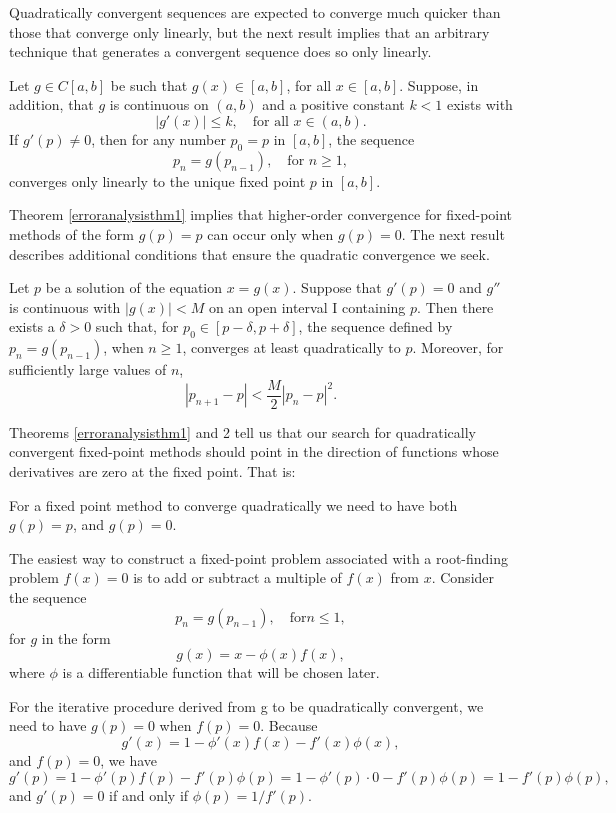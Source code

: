 Quadratically convergent sequences are expected to converge much quicker than those that converge only linearly, but the next result implies that an arbitrary technique that  generates a convergent sequence does so only linearly.

\begin{theorem}\label{erroranalysisthm1}
Let $g\in C[a,b]$ be such that $g(x)\in[a,b]$, for all $x\in[a,b]$. Suppose, in addition, that $g$ is  continuous on $(a,b)$ and a positive constant $k<1$ exists with
\[|g'(x)|\leq k,\quad\mbox{for all } x\in(a,b).\]
If $g'(p)\neq0$, then for any number $p_0=p$ in $[a,b]$, the sequence
\[p_n=g(p_{n-1}),\quad\mbox{for } n\geq1,\]
converges only linearly to the unique fixed point $p$ in $[a,b]$.
\end{theorem}

Theorem \ref{erroranalysisthm1} implies that higher-order convergence for fixed-point methods of the form $ g(p) = p$ can occur only when $g(p) = 0$. The next result describes additional conditions that ensure the quadratic convergence we seek.

\begin{theorem}\label{erroranalysisthem2}
Let $p$ be a solution of the equation $x = g(x)$. Suppose that $g'(p) = 0$ and $g''$ is continuous with $|g(x)|<M$ on an open interval I containing $p$. Then there exists a $\delta>0$ such that, for $p_0\in[p-\delta, p+\delta]$, the sequence defined by $p_n = g(p_{n-1})$, when $n\geq1$, converges at least quadratically to $p$.  Moreover, for sufficiently large values of $n$,
\[|p_{n+1}-p|<\frac{M}{2}|p_n-p|^2.\]
\end{theorem}
Theorems \ref{erroranalysisthm1} and 2 tell us that our search for quadratically convergent fixed-point methods should point in the direction of functions whose derivatives are zero at the fixed
 point. That is:
\begin{boxB} 
For a fixed point method to converge quadratically we need to have both $g(p) = p$, and $g(p) = 0$.
\end{boxB}

The easiest way to construct a fixed-point problem associated with a root-finding problem $f(x) = 0$ is to add or subtract a multiple of $f(x)$ from $x$. Consider the sequence
\[p_n=g(p_{n-1}),\quad \mbox{for} n\leq1,\]
for $g$ in the form
\[g(x)=x-\phi(x)f(x),\]
 where $\phi$ is a differentiable function that will be chosen later.

For the iterative procedure derived from g to be quadratically convergent, we need to have $g(p) = 0$ when $f(p) = 0$. Because
\[g'(x)=1-\phi'(x)f(x)-f'(x)\phi(x),\]
and $f(p)=0$, we have
\[g'(p)=1-\phi'(p)f(p)-f'(p)\phi(p)=1-\phi'(p)\cdot0-f'(p)\phi(p)=1-f'(p)\phi(p),\]
and $g'(p)=0$ if and only if $\phi(p)=1/f'(p)$.

